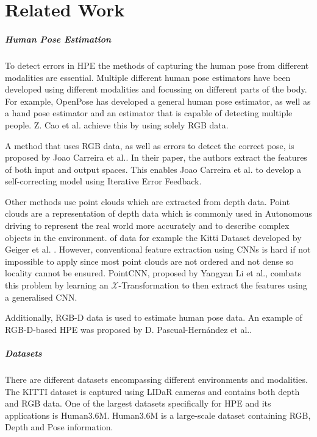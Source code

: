 \chapter{Related Work}
\label{sec:related_work}

\paragraph{Human Pose Estimation}

To detect errors in HPE the methods of capturing the human pose from different modalities are essential. Multiple different human pose estimators have been developed using different modalities and focussing on different parts of the body. For example, OpenPose has developed a general human pose estimator\cite{OpenPosePose}, as well as a hand pose estimator\cite{OpenPoseHand} and an estimator that is capable of detecting multiple people\cite{OpenPoseMulti}. Z. Cao et al. achieve this by using solely RGB data.

A method that uses RGB data, as well as errors to detect the correct pose, is proposed by Joao Carreira et al.\cite{IterativeErrorFeedback}. In their paper, the authors extract the features of both input and output spaces. This enables Joao Carreira et al. to develop a self-correcting model using Iterative Error Feedback.

Other methods use point clouds which are extracted from depth data. Point clouds are a representation of depth data which is commonly used in Autonomous driving to represent the real world more accurately and to describe complex objects in the environment. of data for example the Kitti Dataset developed by Geiger et al. \cite{Geiger2012CVPR}. However, conventional feature extraction using CNNs is hard if not impossible to apply since most point clouds are not ordered and not dense so locality cannot be ensured. PointCNN, proposed by Yangyan Li et al.\cite{li2018pointcnn}, combats this problem by learning an $\mathcal{X}$-Transformation to then extract the features using a generalised CNN.

Additionally, RGB-D data is used to estimate human pose data. An example of RGB-D-based HPE was proposed by D. Pascual-Hernández et al.\cite{PASCUALHERNANDEZ2022102225}.

\paragraph{Datasets}

There are different datasets encompassing different environments and modalities. The KITTI dataset is captured using LIDaR cameras and contains both depth and RGB data\cite{Geiger2012CVPR}. One of the largest datasets specifically for HPE and its applications is Human3.6M\cite{h36m_pami}. Human3.6M is a large-scale dataset containing RGB, Depth and Pose information.

